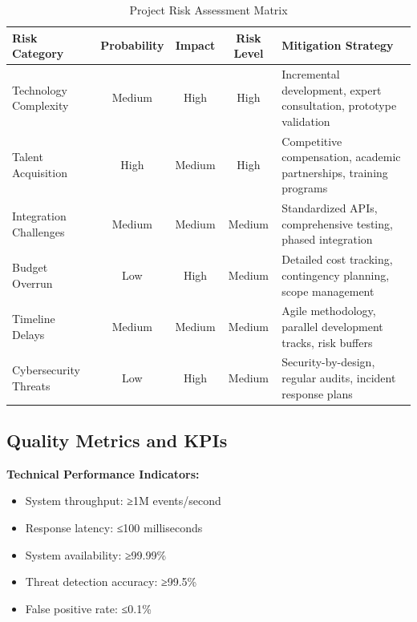 \documentclass[12pt,a4paper]{article}
\begin{document}
\begin{table}[H]
\centering
\caption{Project Risk Assessment Matrix}
\begin{tabular}{|p{4cm}|c|c|c|p{5cm}|}
\hline
\rowcolor{lightblue}
\textbf{Risk Category} & \textbf{Probability} & \textbf{Impact} & \textbf{Risk Level} & \textbf{Mitigation Strategy} \\
\hline

Technology Complexity & Medium & High & High & 
Incremental development, expert consultation, prototype validation \\
\hline

Talent Acquisition & High & Medium & High & 
Competitive compensation, academic partnerships, training programs \\
\hline

Integration Challenges & Medium & Medium & Medium & 
Standardized APIs, comprehensive testing, phased integration \\
\hline

Budget Overrun & Low & High & Medium & 
Detailed cost tracking, contingency planning, scope management \\
\hline

Timeline Delays & Medium & Medium & Medium & 
Agile methodology, parallel development tracks, risk buffers \\
\hline

Cybersecurity Threats & Low & High & Medium & 
Security-by-design, regular audits, incident response plans \\
\hline

\end{tabular}
\end{table}

\subsection{Quality Metrics and KPIs}

\textbf{Technical Performance Indicators:}
\begin{itemize}
    \item System throughput: ≥1M events/second
    \item Response latency: ≤100 milliseconds
    \item System availability: ≥99.99\%
    \item Threat detection accuracy: ≥99.5\%
    \item False positive rate: ≤0.1\%
\end{itemize}
\end{document}
